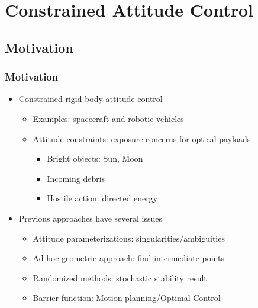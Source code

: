 \documentclass[11pt,professionalfonts]{beamer}
\begin{document}
\section{Constrained Attitude Control}
\subsection{Motivation}

\begin{frame} %
	\frametitle{Motivation}
	\begin{itemize}
		\item Constrained rigid body attitude control
		\begin{itemize}
			\item Examples: spacecraft and robotic vehicles
			\item Attitude constraints: exposure concerns for optical payloads
			\begin{itemize}
				\item Bright objects: Sun, Moon
				\item Incoming debris
				\item Hostile action: directed energy
			\end{itemize}
		\end{itemize}
	\pause
	\item Previous approaches have several issues
	\begin{itemize}
		\item Attitude parameterizations: singularities/ambiguities
		\item Ad-hoc geometric approach: find intermediate points
		\item Randomized methods: stochastic stability result
		\item Barrier function: Motion planning/Optimal Control
	\end{itemize}
\end{itemize}
\end{frame} %
\end{document}
